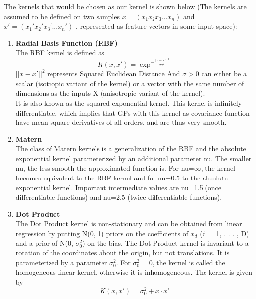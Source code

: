 \documentclass{article}
\begin{document}
	The kernels that would be chosen as our kernel is shown below 
	(The kernels are assumed to be defined on two samples \( x = ( x_{1} x_{2} x_{3} ... x_{n} ) \) and 
	\( x' = ( {x_{1}}' {x_{2}}' {x_{3}}' ... {x_{n}}')\) ,  
	represented as feature vectors in some input space):\\
	\begin{enumerate}
		\item \textbf{Radial Basis Function (RBF)}\\
		The RBF kernel is defined as 
		\begin{equation}\label{eq:kernel_rbf}
			K(x,x') = \exp^{-\frac{||x-x'||^{2}}{2\sigma^{2}}}
		\end{equation}
		\(||x-x'||^{2}\) represents Squared Euclidean Distance 
		And \( \sigma > 0 \) can either be a scalar (isotropic variant of the kernel) or a vector with the same number of dimensions 
		as the inputs X (anisotropic variant of the kernel). \\
		It is also known as the squared exponential kernel. This kernel is infinitely differentiable, 
		which implies that GPs with this kernel as covariance function have mean square derivatives of all orders, 
		and are thus very smooth.\\
		
		\item \textbf{Matern}\\
		The class of Matern kernels is a generalization of the RBF and the absolute exponential kernel parameterized 
		by an additional parameter nu. The smaller nu, the less smooth the approximated function is. For nu=\(\infty\), 
		the kernel becomes equivalent to the RBF kernel and for nu=0.5 to the absolute exponential kernel. 
		Important intermediate values are nu=1.5 (once differentiable functions) and nu=2.5 (twice differentiable functions).\\

		\item \textbf{Dot Product}\\
		The Dot Product kernel is non-stationary and can be obtained from linear regression by putting N(0, 1) priors on the coefficients 
		of \(x_{d}\) (d = 1, . . . , D) and a prior of N(0, \(\sigma_{0}^{2}\)) on the bias. 
		The Dot Product kernel is invariant to a rotation of the coordinates about the origin, but not translations. 
		It is parameterized by a parameter \(\sigma_{0}^{2}\). For \(\sigma_{0}^{2} = 0\), 
		the kernel is called the homogeneous linear kernel, otherwise it is inhomogeneous. The kernel is given by
		\begin{equation}\label{eq:kernel_dp}
			K(x,x') = \sigma_{0}^{2} + x \cdot x'  
		\end{equation}
		\\


\end{enumerate}
\end{document}
